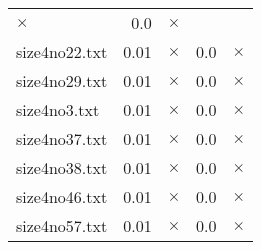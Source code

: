 \documentclass{article}
\begin{document}
\begin{center}
\begin{tabular}{lrrrr}
$\times$
 & 0.0 & 
$\times$
\\
size4no22.txt & 0.01 & 
$\times$
 & 0.0 & 
$\times$
\\
size4no29.txt & 0.01 & 
$\times$
 & 0.0 & 
$\times$
\\
size4no3.txt & 0.01 & 
$\times$
 & 0.0 & 
$\times$
\\
size4no37.txt & 0.01 & 
$\times$
 & 0.0 & 
$\times$
\\
size4no38.txt & 0.01 & 
$\times$
 & 0.0 & 
$\times$
\\
size4no46.txt & 0.01 & 
$\times$
 & 0.0 & 
$\times$
\\
size4no57.txt & 0.01 & 
$\times$
 & 0.0 & 
$\times$
\\
\hline\end{tabular}
\end{center}
\end{document}
